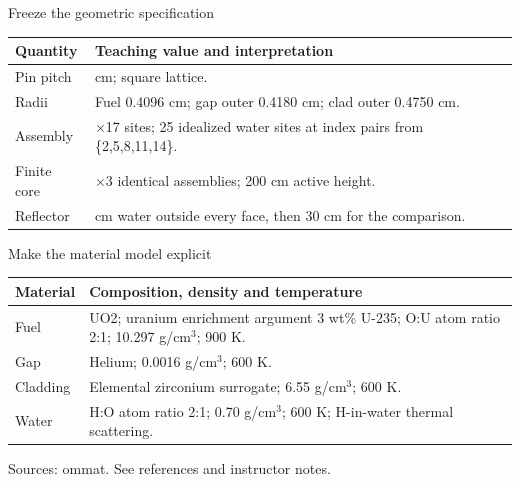 \documentclass[aspectratio=169,11pt]{beamer}
\begin{document}
\begin{frame}[t,fragile]{Freeze the geometric specification}
\fontsize{10.5}{12.5}\selectfont\setlength{\tabcolsep}{4pt}\renewcommand{\arraystretch}{1.15}
\begin{tabular}{>{\raggedright\arraybackslash}p{}>{\raggedright\arraybackslash}p{}}
\toprule
\textbf{Quantity} & \textbf{Teaching value and interpretation} \\ \midrule
Pin pitch & 1.26 cm; square lattice. \\[2pt]
Radii & Fuel 0.4096 cm; gap outer 0.4180 cm; clad outer 0.4750 cm. \\[2pt]
Assembly & 17$\times$17 sites; 25 idealized water sites at index pairs from \{2,5,8,11,14\}. \\[2pt]
Finite core & 3$\times$3 identical assemblies; 200 cm active height. \\[2pt]
Reflector & 20 cm water outside every face, then 30 cm for the comparison. \\[2pt]
\bottomrule\end{tabular}\par\vspace{2mm}
\end{frame}
\begin{frame}[t,fragile]{Make the material model explicit}
\fontsize{10.5}{12.5}\selectfont\setlength{\tabcolsep}{4pt}\renewcommand{\arraystretch}{1.15}
\begin{tabular}{>{\raggedright\arraybackslash}p{}>{\raggedright\arraybackslash}p{}}
\toprule
\textbf{Material} & \textbf{Composition, density and temperature} \\ \midrule
Fuel & UO2; uranium enrichment argument 3 wt\% U-235; O:U atom ratio 2:1; 10.297 g/cm$^3$; 900 K. \\[2pt]
Gap & Helium; 0.0016 g/cm$^3$; 600 K. \\[2pt]
Cladding & Elemental zirconium surrogate; 6.55 g/cm$^3$; 600 K. \\[2pt]
Water & H:O atom ratio 2:1; 0.70 g/cm$^3$; 600 K; H-in-water thermal scattering. \\[2pt]
\bottomrule\end{tabular}\par\vspace{2mm}
\vfill{\fontsize{6.5}{8}\selectfont\color{UTgray} Sources: ommat. See references and instructor notes.\par}
\end{frame}
\end{document}
